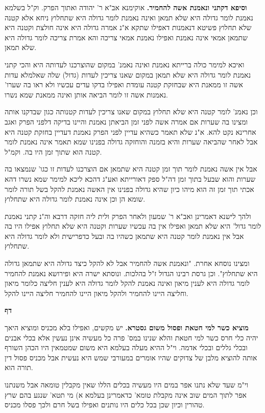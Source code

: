 \documentclass[12pt, openany]{book}
\newcommand{\sethebfont}{
\fontsize{10.5pt}{21.0pt} \selectfont
}
\newcommand{\twocol}[1]{
	{\sethebfont \begin{multicols}{2}
			#1
	\end{multicols}}	
}
\newcommand{\chapname}{}
\newcommand{\newchap}[1]{
	\addcontentsline{toc}{chapter}{#1}
	\renewcommand{\chapname}{#1}
		\begin{center}
			\textbf{%
\fontsize{16pt}{16pt}\selectfont
				#1}
		\end{center}
}
\begin{document}
{\par\textbf{וסיפא דקתני ונאמנת אשה להחמיר.}  אוקימנא אב"א ר' יהודה ואתוך הפרק. וק"ל בשלמא נאמנת לומר גדולה היא שלא תמאן ואינה נאמנת לומר גדולה היא שתחלוץ ניחא אלא קטנה שלא תחלוץ פשיטא דנאמנות דאפילו שתקא א"נ אמרה גדולה היא אינה חולצת וקטנה היא שתמאן אמאי אינה נאמנת ואפילו נאמנת אמאי צריכה והא אמרת צריכה לומר גדולה היא שלא תמאן.\par  ואיכא למימר כולה ברייתא נאמנת ואינה נאמנ' במקום שהוצרכנו לעדותה היא והכי קתני נאמנת לומר גדולה היא שלא תמאן במקום שאנו צריכין לעדות (גדול) שלה שאלמלא עדות אשה זו ממאנת היא שבחזקת קטנה עומדת ואפילו בדקו עדים עכשיו ולא ראו בה שערו' נאמנות אשה זו לומר הביאה אותן ואינה ממאנת שמא נשרו.\par וכן נאמנ' לומר קטנה היא שלא תחלוץ במקום שאנו צריכין לעדות קטנותה כגון שבדקנו אותה ומצינו בה שערות אם אמרה אשה לפני זמן הביאתן נאמנת והיינו בדיקה דלפני הפרק ואגב אחרינא נקט להא. א"נ שלא תאמר כשהיא עדיין לפני הפרק נאמנת דעדיין בחזקת קטנה היא אבל לאחר שהביאה שערות והיא בזמנה והוחזקה גדולה בפנינו שמא תאמר אינה נאמנת לומר קטנה הוא שתוך זמן היו בה. וקמ"ל.\par אבל אין אשה נאמנת לומר תוך זמן קטנה היא שתמאן אם הוצרכנו לעדות זו כגו' שנמצאו בה שערות והוא שבעל בתוך זמן דה"ל ספק דאורייתא ואע"ג דהכא ליכא למימר שמא נשרו דהא אכתי תוך זמן זה הוא מיהו כיון שהיא גדולה בפנינו אין האשה נאמנת להקל בשל תורה לומר שומא הן וכן אינה נאמנת לומר גדולה היא שתחלוץ.\par  ולהך לישנא דאמרינן ואב"א ר' שמעון ולאחר הפרק ולית ליה חזקה דרבא וה"נ קתני נאמנת לומר גדול' היא שלא תמאן ואפילו אין בה עכשיו שערות וקטנה היא שלא תחלוץ אפילו היו בה אבל אין נאמנת לומר קטנה היא שתמאן כשהיו בה ובעל כדפרישית ולא לומר גדולה היא שתחלוץ.\par  ומצינו נוסחא אחרת. "ונאמנת אשה להחמיר אבל לא להקל כיצד גדולה היא שתמאן גדולה היא שתחלוץ". וכן גרסת רבינו הגדול ז"ל בהלכות. ונוסתא ישרה היא ופירושא נאמנת להחמיר לומר גדולה היא לענין מיאון ואינה נאמנת להקל לומר גדולה היא לענין חליצה כלומר מיאון וחליצה היינו להחמיר ולהקל מיאון היינו להחמיר חליצה היינו להקל. 
\par}
\newchap{דף }
\twocol{\textbf{מוציא כשר למי חטאת ופסול משום גסטרא.}  יש מקשים, ואפילו בלא מכניס ומוציא היאך יהיה כלי חרס כשר למי חטאת והלא שנינו במס' פרה כל מעשיה אינן נעשין אלא בכלי אבנים ובכלי גללים ובכלי אדמה. וי"ל ההיא מעלה בעלמא היא משום שמטמאין היו הכהן השורף אותה להוציא מלבן של צדוקים שהיו אומרים במעורבי שמש היא נעשית אבל מכניס פסול דין תורה הוא.\par וי"מ שעד שלא נתנו אפר במים היו מעשיה בכלים הללו שאין מקבלין טומאה אבל משנתנו אפר לתוך המים שוב אינה מקבלת טומא' כדאמרינן בעלמא א) מי תטא' שנגע בהם שרץ טהורין וכיון שכן בכל כלים היו נותנים ואפילו בשל חרם ולכך פסלו מכניס. 
\par}
\end{document}

